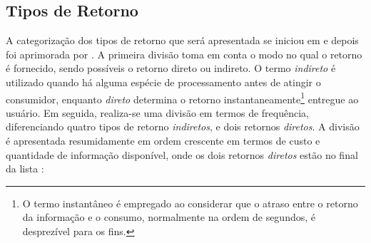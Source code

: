 \subsection{Tipos de Retorno}
\label{ssec:ret_tipos}

A categorização dos tipos de retorno que será apresentada se iniciou em
\cite{2000_darby} e depois foi aprimorada por \cite{2009_epri}. A primeira divisão
toma em conta o modo no qual o retorno é fornecido, sendo possíveis o retorno
direto ou indireto. O termo \emph{indireto} é
utilizado quando há alguma espécie de processamento antes de atingir o
consumidor, enquanto \emph{direto} determina o retorno
instantaneamente\footnote{O termo instantâneo é empregado ao considerar que o
atraso entre o retorno da informação e o consumo, normalmente na ordem de
segundos, é desprezível para os fins.} entregue
ao usuário. Em seguida, realiza-se uma divisão em termos de frequência,
diferenciando quatro tipos de retorno \emph{indiretos}, e dois retornos
\emph{diretos}. A divisão é apresentada resumidamente em ordem crescente em
termos de custo e
quantidade de informação disponível, onde os dois retornos \emph{diretos} estão no
final da lista \cite{aceee_2010_estudos_feedback,2009_epri}:

